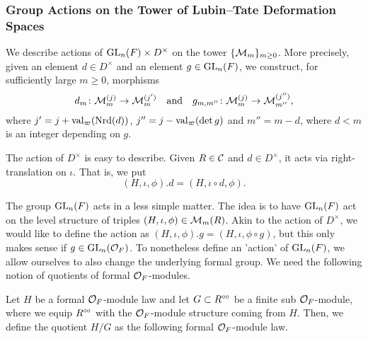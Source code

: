 \documentclass[../main.tex]{subfiles}
\begin{document}
\subsubsection{Group Actions on the Tower of Lubin--Tate Deformation Spaces} %
\label{ssub:Group Actions on the Tower of Lubin--Tate Deformation Spaces}
We describe actions of $\operatorname{GL}_n(F) \times D^\times$ on the tower
$\{\mathcal{M}_m\}_{m \geq 0}$. More precisely, given an element $d \in D^\times$ and an element
$g \in \operatorname{GL}_n(F)$, we construct, for sufficiently large $m\geq 0$, morphisms
\begin{equation*}
  d_m \colon \mathcal{M}_m^{(j)} \to \mathcal{M}_m^{(j')} \quad \text{and} \quad
  g_{m,m''} \colon \mathcal{M}_m^{(j)} \to \mathcal{M}_{m''}^{(j'')},
\end{equation*}
where $j'= j+\mathrm{val}_\varpi(\operatorname{Nrd}(d))$, $j'' = j - \mathrm{val}_\varpi(\det g)$ and $m''
= m-d$, where $d<m$ is an integer depending on $g$. 

The action of $D^\times$ is easy to describe. Given $R \in \mathcal{C}$ and 
$d \in D^\times$, it acts via right-translation on $\iota$. That is, we put
\begin{equation*}
  (H, \iota, \phi).d = (H, \iota \circ d, \phi).
\end{equation*}

The group $\operatorname{GL}_n(F)$ acts in a less simple matter. The idea is to have
$\operatorname{GL}_n(F)$ act on the level structure of triples $(H, \iota, \phi) \in \mathcal{M}_m(R)$.
Akin to the action of $D^\times$, we would like to define the action as
$(H, \iota, \phi).g = (H, \iota, \phi \circ g)$, but this only makes sense
if $g \in \operatorname{GL}_n(\mathcal{O}_F)$. To nonetheless define an 'action' of $\operatorname{GL}_n(F)$, we
allow ourselves to also change the underlying formal group.
We need the following notion of quotients of formal $\mathcal{O}_F$-modules.

\begin{defi}\label{def:QuotientModule}
  Let $H$ be a formal $\mathcal{O}_F$-module law and let $G \subset R^{\circ \hspace{-0.5pt} \circ}$ be a finite
  sub $\mathcal{O}_F$-module, where we equip $R^{\circ \hspace{-0.5pt} \circ}$ with the $\mathcal{O}_F$-module structure 
  coming from $H$. Then, we define the quotient $H/G$ as the following formal
  $\mathcal{O}_F$-module law. 
\end{defi}
\end{document}
